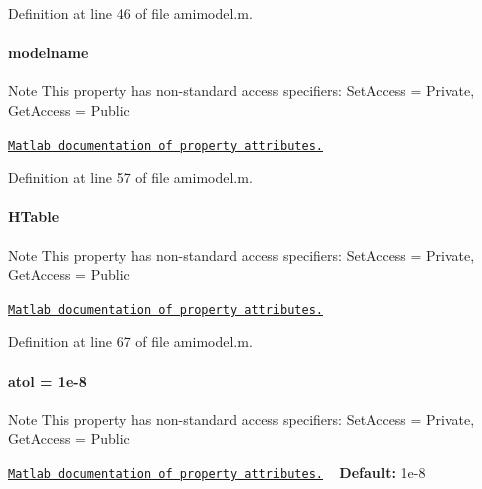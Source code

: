 Definition at line 46 of file amimodel.\+m.

\hypertarget{classamimodel_a71bca9c21a6de42d8079ade31cb61044}{}
\paragraph[{modelname}]{\setlength{\rightskip}{0pt plus 5cm}modelname}\label{classamimodel_a71bca9c21a6de42d8079ade31cb61044}
\begin{DoxyNote}{Note}
This property has non-\/standard access specifiers\+: {\ttfamily Set\+Access = Private, Get\+Access = Public} 

\href{http://www.mathworks.com/help/matlab/matlab_oop/property-attributes.html}{\tt Matlab documentation of property attributes.} 
\end{DoxyNote}


Definition at line 57 of file amimodel.\+m.

\hypertarget{classamimodel_aafe6335df413dd688a2f44efba012cf1}{}
\paragraph[{H\+Table}]{\setlength{\rightskip}{0pt plus 5cm}H\+Table}\label{classamimodel_aafe6335df413dd688a2f44efba012cf1}
\begin{DoxyNote}{Note}
This property has non-\/standard access specifiers\+: {\ttfamily Set\+Access = Private, Get\+Access = Public} 

\href{http://www.mathworks.com/help/matlab/matlab_oop/property-attributes.html}{\tt Matlab documentation of property attributes.} 
\end{DoxyNote}


Definition at line 67 of file amimodel.\+m.

\hypertarget{classamimodel_a0c5f3dcf809a17b895fe12fc91272349}{}
\paragraph[{atol}]{\setlength{\rightskip}{0pt plus 5cm}atol = 1e-\/8}\label{classamimodel_a0c5f3dcf809a17b895fe12fc91272349}
\begin{DoxyNote}{Note}
This property has non-\/standard access specifiers\+: {\ttfamily Set\+Access = Private, Get\+Access = Public} 

\href{http://www.mathworks.com/help/matlab/matlab_oop/property-attributes.html}{\tt Matlab documentation of property attributes.} ~\newline
{\bfseries Default\+:} 1e-\/8 
\end{DoxyNote}



